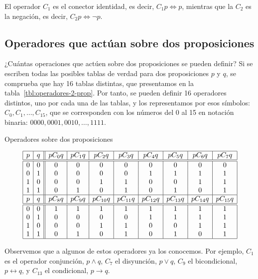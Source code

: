 El operador $C_1$ es el conector identidad, es decir, $C_1 p \iff p$,
mientras que la $C_2$ es la negación, es decir, $C_2 p \iff \neg p$.




\subsection{Operadores que actúan sobre dos proposiciones}

¿Cuántas operaciones que actúen sobre dos proposiciones se pueden definir?
Si se escriben todas las posibles tablas de verdad para dos proposiciones
$p$ y $q$, se comprueba que hay 16 tablas distintas, que presentamos en la
tabla~\ref{tbl:operadores-2-prop}. Por tanto, se pueden definir 16
operadores distintos, uno por cada una de las tablas, y los representamos
por esos símbolos: $C_0, C_1, \ldots, C_{15}$, que se corresponden con los
números del 0 al 15 en notación binaria: $0000, 0001, 0010, \ldots, 1111$.

\begin{table}[h]%
  \caption{Operadores sobre dos proposiciones}
  \label{tbl:operadores-2-prop}%
  \centering
  $$
    \begin{array}{|c|c||c|c|c|c|c|c|c|c|}
    \hline
    p & q & p C_0 q & p C_1 q & p C_2 q & p C_3 q & p C_4 q & p C_5 q & p
      C_6 q & p C_7 q \\
    \hline
    \hline
    0 & 0 & 0 & 0 & 0 & 0 & 0 & 0 & 0 & 0 \\
    0 & 1 & 0 & 0 & 0 & 0 & 1 & 1 & 1 & 1 \\
    1 & 0 & 0 & 0 & 1 & 1 & 0 & 0 & 1 & 1 \\
    1 & 1 & 0 & 1 & 0 & 1 & 0 & 1 & 0 & 1 \\
    \hline
    p & q & p C_8 q & p C_9 q & p C_{10} q & p C_{11} q & p C_{12} q & p
      C_{13} q & p C_{14} q & p C_{15} q \\
    \hline
    \hline
    0 & 0 & 1 & 1 & 1 & 1 & 1 & 1 & 1 & 1 \\
    0 & 1 & 0 & 0 & 0 & 0 & 1 & 1 & 1 & 1 \\
    1 & 0 & 0 & 0 & 1 & 1 & 0 & 0 & 1 & 1 \\
    1 & 1 & 0 & 1 & 0 & 1 & 0 & 1 & 0 & 1 \\
    \hline
    \end{array}
  $$
\end{table}

Observemos que a algunos de estos operadores ya los conocemos. Por ejemplo,
$C_1$ es el operador conjunción, $p \land q$, $C_7$ el disyunción, $p \lor
q$, $C_9$ el bicondicional, $p \longleftrightarrow q$, y $C_{13}$ el
condicional, $p \longrightarrow q$.

